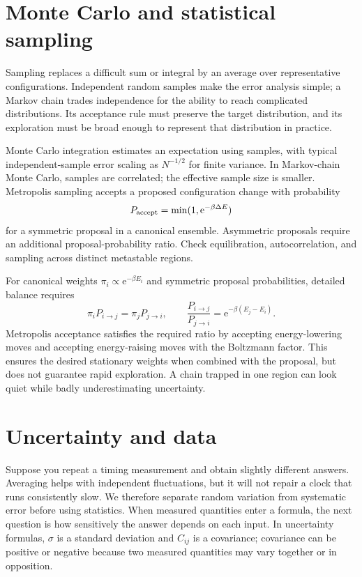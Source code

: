 \documentclass[11pt,oneside]{book}
\newcommand{\ee}{\mathrm{e}}
\theoremstyle{reviewstyle}
\begin{document}
\section{Monte Carlo and statistical sampling}
Sampling replaces a difficult sum or integral by an average over representative configurations. Independent random samples make the error analysis simple; a Markov chain trades independence for the ability to reach complicated distributions. Its acceptance rule must preserve the target distribution, and its exploration must be broad enough to represent that distribution in practice.

Monte Carlo integration estimates an expectation using samples, with typical independent-sample error scaling as $N^{-1/2}$ for finite variance. In Markov-chain Monte Carlo, samples are correlated; the effective sample size is smaller. Metropolis sampling accepts a proposed configuration change with probability
\begin{equation}P_{\rm accept}=\min(1,\ee^{-\beta\Delta E})\end{equation}
for a symmetric proposal in a canonical ensemble. Asymmetric proposals require an additional proposal-probability ratio. Check equilibration, autocorrelation, and sampling across distinct metastable regions.

For canonical weights $\pi_i\propto\ee^{-\beta E_i}$ and symmetric proposal probabilities, detailed balance requires
\begin{equation}
\pi_iP_{i\to j}=\pi_jP_{j\to i},\qquad
\frac{P_{i\to j}}{P_{j\to i}}=\ee^{-\beta(E_j-E_i)}.
\end{equation}
Metropolis acceptance satisfies the required ratio by accepting energy-lowering moves and accepting energy-raising moves with the Boltzmann factor. This ensures the desired stationary weights when combined with the proposal, but does not guarantee rapid exploration. A chain trapped in one region can look quiet while badly underestimating uncertainty.

\section{Uncertainty and data}
Suppose you repeat a timing measurement and obtain slightly different answers. Averaging helps with independent fluctuations, but it will not repair a clock that runs consistently slow. We therefore separate random variation from systematic error before using statistics. When measured quantities enter a formula, the next question is how sensitively the answer depends on each input. In uncertainty formulas, $\sigma$ is a standard deviation and $C_{ij}$ is a covariance; covariance can be positive or negative because two measured quantities may vary together or in opposition.
\end{document}
